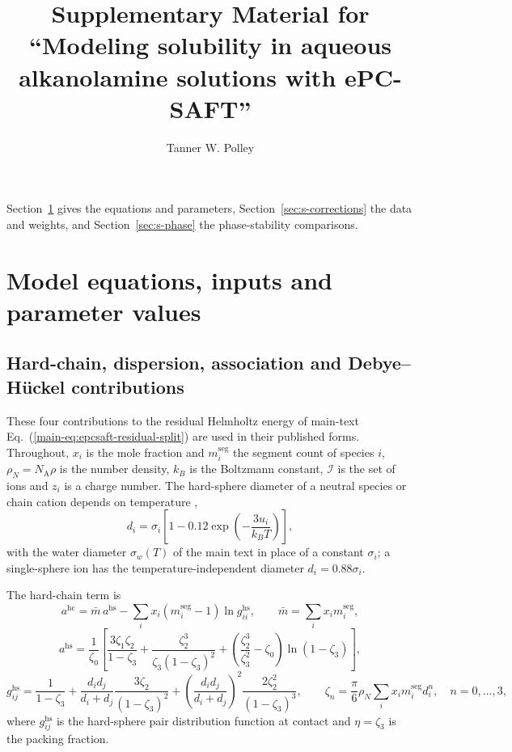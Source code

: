 \documentclass[a4paper,11pt]{article}
\title{Supplementary Material for ``Modeling \ce{CO2} solubility in aqueous alkanolamine solutions with ePC-SAFT''}
\author{Tanner W. Polley}
\date{}
\begin{document}
\maketitle

Section~\ref{sec:s-parameters} gives the equations and parameters, Section~\ref{sec:s-corrections} the data and weights, and Section~\ref{sec:s-phase} the phase-stability comparisons.

\section{Model equations, inputs and parameter values}\label{sec:s-parameters}
\subsection{Hard-chain, dispersion, association and Debye--H\"uckel contributions}\label{sec:s-contributions}
These four contributions to the residual Helmholtz energy of main-text Eq.~(\ref{main-eq:epcsaft-residual-split}) are used in their published forms.
Throughout, $x_i$ is the mole fraction and $m_i^{\mathrm{seg}}$ the segment count of species $i$, $\rho_N=N_{\mathrm A}\rho$ is the number density, $k_B$ is the Boltzmann constant, $\mathcal I$ is the set of ions and $z_i$ is a charge number.
The hard-sphere diameter of a neutral species or chain cation depends on temperature \cite{Gross2001},
\begin{equation}
    d_i=\sigma_i\left[1-0.12\exp\!\left(-\frac{3u_i}{k_BT}\right)\right],
    \label{eq:hard-sphere-diameter}
\end{equation}
with the water diameter $\sigma_w(T)$ of the main text in place of a constant $\sigma_i$; a single-sphere ion has the temperature-independent diameter $d_i=0.88\sigma_i$.

The hard-chain term is \cite{Gross2001}
\begin{equation}
    a^{\mathrm{hc}}=\bar m\,a^{\mathrm{hs}}-\sum_i x_i\left(m_i^{\mathrm{seg}}-1\right)\ln g_{ii}^{\mathrm{hs}},
    \qquad
    \bar m=\sum_i x_im_i^{\mathrm{seg}},
    \label{eq:hard-chain}
\end{equation}
\begin{equation}
    a^{\mathrm{hs}}=\frac{1}{\zeta_0}\left[
    \frac{3\zeta_1\zeta_2}{1-\zeta_3}
    +\frac{\zeta_2^3}{\zeta_3\left(1-\zeta_3\right)^2}
    +\left(\frac{\zeta_2^3}{\zeta_3^2}-\zeta_0\right)\ln\left(1-\zeta_3\right)
    \right],
    \label{eq:hard-sphere}
\end{equation}
\begin{equation}
    g_{ij}^{\mathrm{hs}}=\frac{1}{1-\zeta_3}
    +\frac{d_id_j}{d_i+d_j}\frac{3\zeta_2}{\left(1-\zeta_3\right)^2}
    +\left(\frac{d_id_j}{d_i+d_j}\right)^2\frac{2\zeta_2^2}{\left(1-\zeta_3\right)^3},
    \qquad
    \zeta_n=\frac{\pi}{6}\rho_N\sum_i x_im_i^{\mathrm{seg}}d_i^n,
    \quad n=0,\dots,3,
    \label{eq:hard-sphere-contact}
\end{equation}
where $g_{ij}^{\mathrm{hs}}$ is the hard-sphere pair distribution function at contact and $\eta=\zeta_3$ is the packing fraction.
\end{document}
